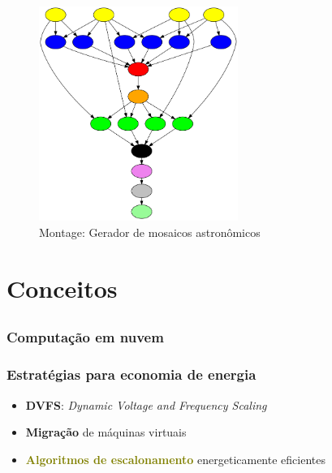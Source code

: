 \documentclass{beamer}
\newcommand{\colorize}[2]{\textbf{\textcolor{#1}{#2}}}
\begin{document}
\begin{frame}
\frametitle{}

\begin{figure}[htp]
\begin{center}
  \includegraphics[height=7cm]{Montage_PP.png}
  \caption[map]{Montage: Gerador de mosaicos astronômicos}
\end{center}
\end{figure}


\end{frame}


\section{Conceitos}
\subsection{}

\begin{frame}
\frametitle{Computação em nuvem}
\end{frame}

\begin{frame}
\frametitle{Estratégias para economia de energia}
\begin{itemize}
	\item \colorize{n_red}{DVFS}: \emph{Dynamic Voltage and Frequency Scaling}
	\item \colorize{n_blue}{Migração} de máquinas virtuais
	\item \colorize{olive}{Algoritmos de escalonamento} energeticamente eficientes
\end{itemize}
\end{frame}
\end{document}
